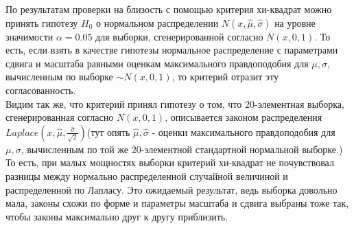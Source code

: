 \documentclass[../body.tex]{subfiles}
\begin{document}
	По результатам проверки на близость с помощью критерия хи-квадрат можно принять гипотезу $H_0$ о нормальном распределении $N(x, \hat{\mu}, \hat{\sigma})$ на уровне значимости $ \alpha = 0.05$ для выборки, сгенерированной согласно $N(x, 0, 1)$. То есть, если взять в качестве гипотезы нормальное распределение с параметрами сдвига и масштаба равными оценкам максимального правдоподобия для $\mu, \sigma$, вычисленным по выборке $\sim N(x, 0, 1)$, то критерий отразит эту согласованность.\\
	Видим так же, что критерий принял гипотезу о том, что $20$-элементная выборка, сгенерированная согласно $N(x, 0, 1)$, описывается законом распределения $Laplace(x, \hat{\mu},\frac{\hat{\sigma}}{\sqrt2} )$(тут опять $\hat{\mu}, \hat{\sigma}$ - оценки максимального правдоподобия для $\mu, \sigma$, вычисленным по той же $20$-элементной стандартной нормальной выборке.)\\То есть, при малых мощностях выборки критерий хи-квадрат не почувствовал разницы между нормально распределенной случайной величиной и распределенной по Лапласу. Это ожидаемый результат, ведь выборка довольно мала, законы схожи по форме и параметры масштаба и сдвига выбраны тоже так, чтобы законы максимально друг к другу приблизить. 
\end{document}
